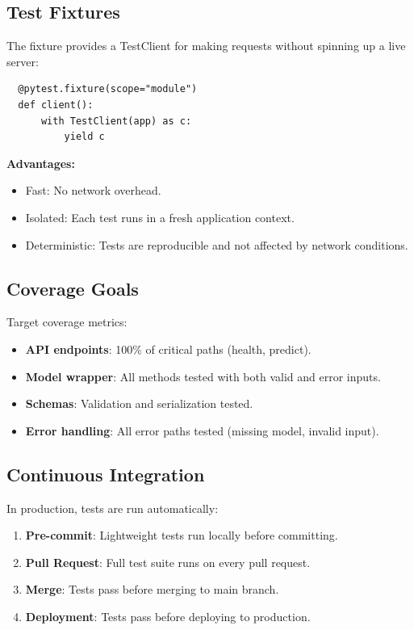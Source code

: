 \subsection{Test Fixtures}

The  fixture provides a TestClient for making requests without spinning up a live server:

\begin{verbatim}
  @pytest.fixture(scope="module")
  def client():
      with TestClient(app) as c:
          yield c
\end{verbatim}

\textbf{Advantages:}
\begin{itemize}
  \item Fast: No network overhead.
  \item Isolated: Each test runs in a fresh application context.
  \item Deterministic: Tests are reproducible and not affected by network conditions.
\end{itemize}

\subsection{Coverage Goals}

Target coverage metrics:

\begin{itemize}
  \item \textbf{API endpoints}: 100\% of critical paths (health, predict).
  
  \item \textbf{Model wrapper}: All methods tested with both valid and error inputs.
  
  \item \textbf{Schemas}: Validation and serialization tested.
  
  \item \textbf{Error handling}: All error paths tested (missing model, invalid input).
\end{itemize}

\subsection{Continuous Integration}

In production, tests are run automatically:

\begin{enumerate}
  \item \textbf{Pre-commit}: Lightweight tests run locally before committing.
  
  \item \textbf{Pull Request}: Full test suite runs on every pull request.
  
  \item \textbf{Merge}: Tests pass before merging to main branch.
  
  \item \textbf{Deployment}: Tests pass before deploying to production.
\end{enumerate}

